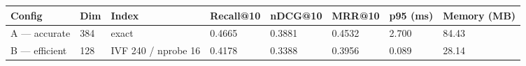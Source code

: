 \begin{tabular}{llllllll}
\hline
Config & Dim & Index & Recall@10 & nDCG@10 & MRR@10 & p95 (ms) & Memory (MB) \\
\hline
A --- accurate & 384 & exact & 0.4665 & 0.3881 & 0.4532 & 2.700 & 84.43 \\
B --- efficient & 128 & IVF 240 / nprobe 16 & 0.4178 & 0.3388 & 0.3956 & 0.089 & 28.14 \\
\hline
\end{tabular}
